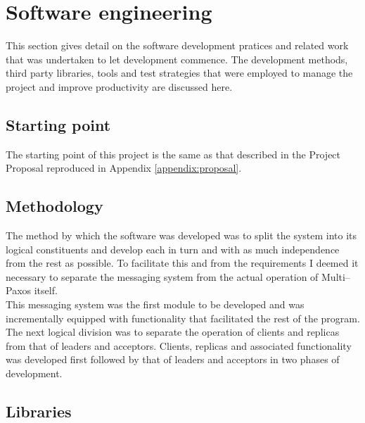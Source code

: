 



\section{Software engineering}

This section gives detail on the software development pratices and related work that was undertaken to let development commence. The development methods, third party libraries, tools and test strategies that were employed to manage the project and improve productivity are discussed here.

\subsection{Starting point}

The starting point of this project is the same as that described in the Project Proposal reproduced in Appendix \ref{appendix:proposal}.

\subsection{Methodology}

The method by which the software was developed was to split the system into its logical constituents and develop each in turn and with as much independence from the rest as possible. To facilitate this and from the requirements I deemed it necessary to separate the messaging system from the actual operation of Multi--Paxos itself. \\

This messaging system was the first module to be developed and was incrementally equipped with functionality that facilitated the rest of the program. The next logical division was to separate the operation of clients and replicas from that of leaders and acceptors. Clients, replicas and associated functionality was developed first followed by that of leaders and acceptors in two phases of development. \\

\subsection{Libraries}

